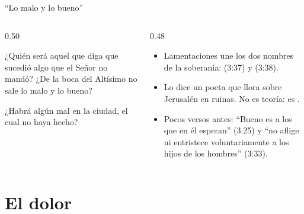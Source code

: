 \begin{frame}{``Lo malo y lo bueno''}
\begin{columns}[t,onlytextwidth]
\begin{column}{0.50\textwidth}
\begin{cita}¿Quién será aquel que diga que sucedió algo que el Señor no mandó? ¿De la boca del Altísimo no sale lo malo y lo bueno?\end{cita}
\begin{cita}¿Habrá algún mal en la ciudad, el cual \SENOR{} no haya hecho?\end{cita}
\end{column}
\begin{column}{0.48\textwidth}\small
\begin{itemize}
\item Lamentaciones une los dos nombres de la soberanía:  (3:37) y  (3:38).
\item Lo dice un poeta que llora sobre Jerusalén en ruinas. No es teoría: es .
\item Pocos versos antes: ``Bueno es \SENOR{} a los que en él esperan'' (3:25) y ``no aflige ni entristece voluntariamente a los hijos de los hombres'' (3:33).
\end{itemize}
\end{column}
\end{columns}\par\smallskip
{}
\end{frame}

\section{El dolor}

